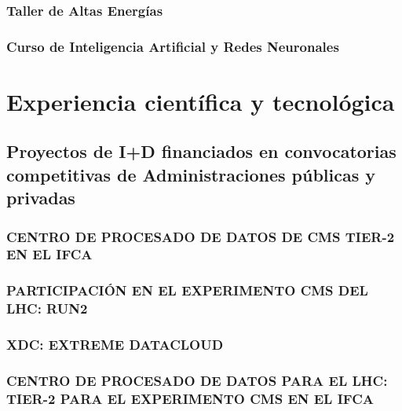 \documentclass[a4paper, 11pt, twoside, openright]{report}
\begin{document}
\subsection{Taller de Altas Energías}


\subsection{Curso de Inteligencia Artificial y Redes Neuronales}



\chapter{Experiencia científica y tecnológica}

\section{Proyectos de I+D financiados en convocatorias competitivas de Administraciones públicas y privadas}


\subsection{CENTRO DE PROCESADO DE DATOS DE CMS TIER-2 EN EL IFCA}


\subsection{PARTICIPACIÓN EN EL EXPERIMENTO CMS DEL LHC: RUN2}


\subsection{XDC: EXTREME DATACLOUD}


\subsection{CENTRO DE PROCESADO DE DATOS PARA EL LHC: TIER-2 PARA EL EXPERIMENTO CMS EN EL IFCA}

\end{document}
